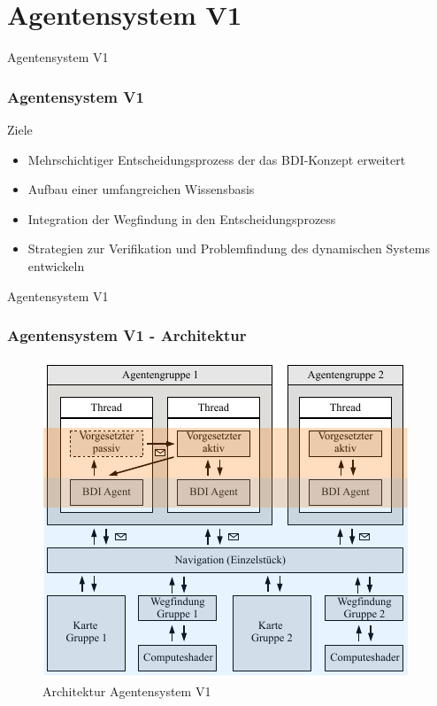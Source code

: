 \documentclass[aspectratio=169]{beamer} %
\begin{document}
\section{Agentensystem V1}
\begin{frame}{Agentensystem V1}
\frametitle{Agentensystem V1}
\begin{block}{Ziele}
\begin{itemize}
	\item Mehrschichtiger Entscheidungsprozess der das BDI-Konzept erweitert
	\item Aufbau einer umfangreichen Wissensbasis
	\item Integration der Wegfindung in den Entscheidungsprozess
	\item Strategien zur Verifikation und Problemfindung des dynamischen Systems entwickeln
\end{itemize}
\end{block}
\end{frame}
\begin{frame}{Agentensystem V1}
\frametitle{Agentensystem V1 - Architektur}
	\begin{figure}
		\includegraphics[scale=1]{./figures/Architekturdiagramm.pdf}
		\caption{Architektur Agentensystem V1}
		\label{debugger}
	\end{figure}
\end{frame}
\end{document}
